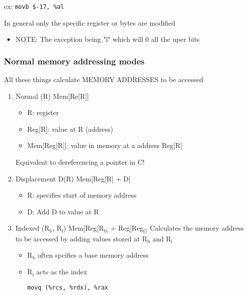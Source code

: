 \documentclass[11pt]{article}
\begin{document}
ex: \texttt{movb \$-17, \%al} 

In general only the specific register or bytes are modified
\begin{itemize}
\item NOTE: The exception being "l" which will 0 all the uper bits
\end{itemize}
\subsubsection{Normal memory addressing modes}
\label{sec-6-1-3}
All these things calculate MEMORY ADDRESSES to be accessed
\begin{enumerate}
\item Normal (R) Mem[Re[R]]
\label{sec-6-1-3-1}
\begin{itemize}
\item R: register
\item Reg[R]: value at R (address)
\item Mem[Reg[R]]: value in memory at a address Reg[R]
\end{itemize}

Equivalent to dereferencing a pointer in C!
\item Displacement D(R) Mem[Reg[R] + D]
\label{sec-6-1-3-2}
\begin{itemize}
\item R: specifies start of memory address
\item D: Add D to value at R
\end{itemize}
\item Indexed (R$_{\text{b}}$, R$_{\text{i}}$) Mem[Reg[R$_{\text{b]}}$ + Reg[Reg$_{\text{i]]}}$
\label{sec-6-1-3-3}
Calculates the memory address to be accessed by adding values stored at R$_{\text{b}}$ and R$_{\text{i}}$ 
\begin{itemize}
\item R$_{\text{b}}$ often spcifies a base memory address
\item R$_{\text{i}}$ acts as the index

\texttt{movq (\%rcs, \%rdx), \%rax}
\end{itemize}


\end{enumerate}
\end{document}
